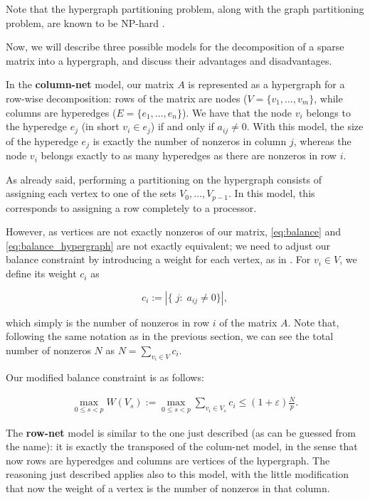 Note that the hypergraph partitioning problem, along with the graph partitioning problem, are known to be NP-hard \cite[Ch.~6]{lengauer}. 

Now, we will describe three possible models for the decomposition of a sparse matrix into a hypergraph, and discuss their advantages and disadvantages.

In the \textbf{column-net} model, our matrix $A$ is represented as a hypergraph for a row-wise decomposition: rows of the matrix are nodes ($V=\{v_1,\dots,v_m\}$, while columns are hyperedges ($E= \{e_1,\dots,e_n\}$). We have that the node $v_i$ belongs to the hyperedge $e_j$ (in short $v_i \in e_j$) if and only if $a_{ij} \neq 0$. With this model, the size of the hyperedge $e_j$ is exactly the number of nonzeros in column $j$, whereas the node $v_i$ belongs exactly to as many hyperedges as there are nonzeros in row $i$.

As already said, performing a partitioning on the hypergraph consists of assigning each vertex to one of the sets $V_0,\dots,V_{p-1}$. In this model, this corresponds to assigning a row completely to a processor. 

However, as vertices are not exactly nonzeros of our matrix, \eqref{eq:balance} and \eqref{eq:balance_hypergraph} are not exactly equivalent; we need to adjust our balance constraint by introducing a weight for each vertex, as in \cite[Def.~4.34]{BSP}. For $v_i \in V$, we define its weight $c_i$ as

\[
	c_i := |\{\;j : \;a_{ij} \neq 0\}|,
\]

which simply is the number of nonzeros in row $i$ of the matrix $A$. Note that, following the same notation as in the previous section, we can see the total number of nonzeros $N$ as $N = \sum_{v_i \in V} c_i$.

Our modified balance constraint is as follows:

\begin{align}
	\max_{0 \leq s <p}	W(V_s) := \max_{0 \leq s <p} \sum_{v_i \in V_s} c_i \leq (1 + \varepsilon) \frac{N}{p}.
	\label{eq:balance_columnet}
\end{align}

The \textbf{row-net} model is similar to the one just described (as can be guessed from the name): it is exactly the transposed of the colum-net model, in the sense that now rows are hyperedges and columns are vertices of the hypergraph. The reasoning just described applies also to this model, with the little modification that now the weight of a vertex is the number of nonzeros in that column.

